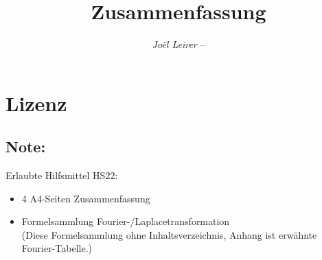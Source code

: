 \documentclass[margin=normal]{tex/hsrzf}
\author{\textsl{Joël Leirer} -- \texttt{\theauthoremail}}
\title{\texttt{\themodule} Zusammenfassung}
\date{\thesemester}
\begin{document}

\maketitle



\section*{Lizenz}
\doclicenseThis

\subsection*{Note:}
Erlaubte Hilfsmittel HS22:
\begin{itemize}
  \item 4 A4-Seiten Zusammenfassung
  \item Formelsammlung Fourier-/Laplacetransformation 
  \\ {\tiny(Diese Formelsammlung ohne Inhaltsverzeichnis, Anhang ist erwähnte Fourier-Tabelle.)}
\end{itemize} 


\newpage
\tableofcontents

\clearpage
\setcounter{page}{1}









\newpage

\end{document}

